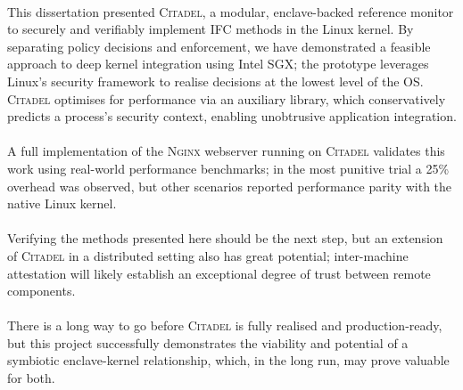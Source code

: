 \paragraph{} This dissertation presented \textsc{Citadel}, a modular, enclave-backed reference monitor to securely and verifiably implement IFC methods in the Linux kernel. By separating policy decisions and enforcement, we have demonstrated a feasible approach to deep kernel integration using Intel SGX; the prototype leverages Linux's security framework to realise decisions at the lowest level of the OS. \textsc{Citadel} optimises for performance via an auxiliary library, which conservatively predicts a process's security context, enabling unobtrusive application integration.

\paragraph{} A full implementation of the \textsc{Nginx} webserver running on \textsc{Citadel} validates this work using real-world performance benchmarks; in the most punitive trial a 25\% overhead was observed, but other scenarios reported performance parity with the native Linux kernel.

\paragraph{} Verifying the methods presented here should be the next step, but an extension of \textsc{Citadel} in a distributed setting also has great potential; inter-machine attestation will likely establish an exceptional degree of trust between remote components.


\paragraph{} There is a long way to go before \textsc{Citadel} is fully realised and production-ready, but this project successfully demonstrates the viability and potential of a symbiotic enclave-kernel relationship, which, in the long run, may prove valuable for both.